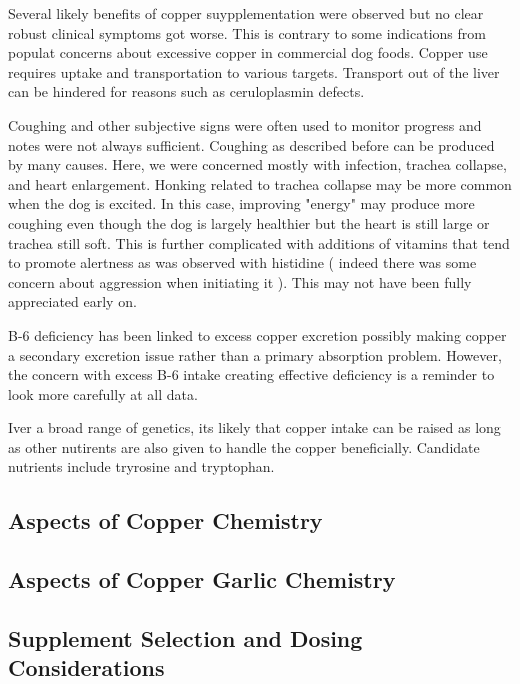 Several likely benefits of copper suypplementation were observed
but no clear robust clinical symptoms got worse.
This is contrary to some indications from populat concerns
about excessive copper in commercial dog foods. 
Copper use requires uptake and transportation to 
various targets. Transport out of the liver can be hindered
for reasons such as ceruloplasmin defects.

Coughing and other subjective signs were often used
to monitor progress and notes were not always sufficient.
Coughing as described before can be produced by many
causes. Here, we were concerned mostly with infection,
trachea collapse, and heart enlargement. Honking
related to trachea collapse may be more common when the
dog is excited. In this case, improving "energy" may
produce more coughing even though the dog is largely
healthier but the heart is still large or trachea
still soft. This is further complicated with additions
of vitamins that tend to promote alertness as was 
observed with histidine ( indeed there was some concern
about aggression when initiating it ). This may not
have been fully appreciated early on.  


B-6 deficiency has been linked to excess copper excretion \cite{PMID7814236}
possibly making copper a secondary excretion issue
rather than a primary absorption problem. 
However, the concern with excess B-6 intake creating effective
deficiency is a reminder to look more carefully at all data. 


Iver a broad range of genetics, its likely that copper intake
can be raised as long as other nutirents are also given
to handle the copper beneficially.
Candidate nutrients include tryrosine and tryptophan.

\subsection{Aspects of Copper Chemistry  }

\subsection{Aspects of Copper Garlic  Chemistry  }


\subsection{Supplement Selection and Dosing Considerations  }


